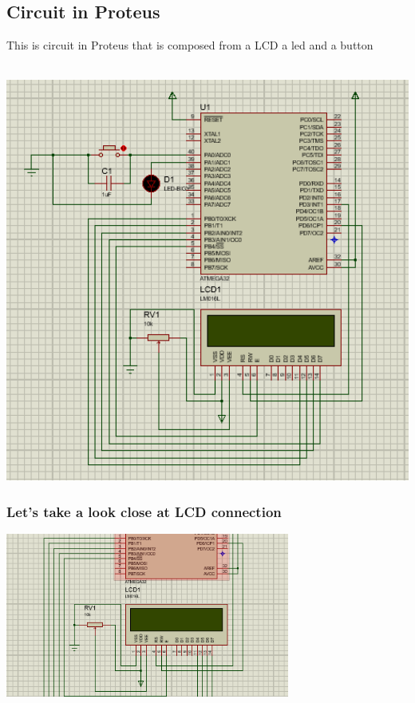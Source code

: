 \subsection{Circuit in Proteus}
This is circuit in Proteus that is composed from a LCD a led and a button\\\\
\centerline{
	\includegraphics[width=1.0\textwidth]{solution/images/schematics1.png}
}

\newpage
\subsubsection{Let's take a look close at LCD connection \\}
\centerline{
	\includegraphics[width=0.7\textwidth]{solution/images/schematics3.png}
}
\vspace{1cm}
